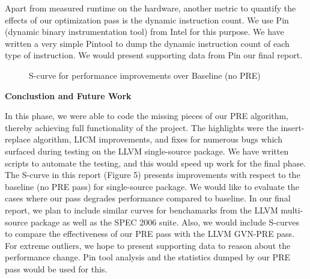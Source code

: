 \documentclass[10pt,twoside]{report}
\begin{document}
Apart from measured runtime on the hardware, another metric to quantify the
effects of our optimization pass is the dynamic instruction count. We use Pin
(dynamic binary instrumentation tool) from Intel for this purpose. We have
written a very simple Pintool to dump the dynamic instruction count of each
type of instruction. We would present supporting data from Pin our final
report.

\begin{figure}
\begin{center}
\end{center}
\label{fig:6}
\caption{S-curve for performance improvements over Baseline (no PRE)}
\end{figure}

\begin{flushleft}
\textbf{\Large{{Conclustion and Future Work }}}
\end{flushleft} 
In this phase, we were able to code the missing pieces of our PRE algorithm,
   thereby achieving full functionality of the project. The highlights were the
   insert-replace algorithm, LICM improvements, and fixes for numerous bugs
   which surfaced during testing on the LLVM single-source package. We have
   written scripts to automate the testing, and this would speed up work for
   the final phase. \\ 
   The S-curve in this report (Figure 5)
   presents improvements with respect to the baseline (no PRE pass) for
   single-source package. We would like to evaluate the cases where our pass
   degrades performance compared to baseline. In our final report, we plan to
   include similar curves for benchamarks from the LLVM multi-source package as
   well as the SPEC 2006 suite. Also, we would include S-curves to compare the
   effectiveness of our PRE pass with the LLVM GVN-PRE pass. For extreme
   outliers, we hope to present supporting data to reason about the performance
   change. Pin tool analysis and the statistics dumped by our PRE pass would be
   used for this.


   
\nocite{*}

  
\end{document}
